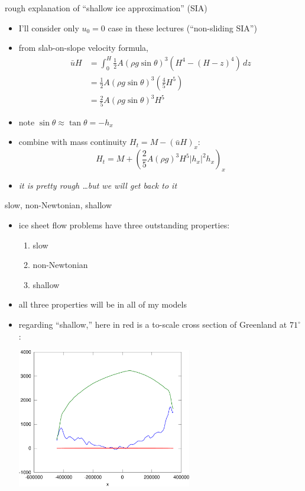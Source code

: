 \begin{frame}{rough explanation of ``shallow ice approximation'' (SIA)}

\small
\begin{itemize}
\item I'll consider only $u_0=0$ case in these lectures (``non-sliding SIA'')
\item from slab-on-slope velocity formula,
\begin{align*}
\bar u H &= \int_0^H \frac{1}{2} A (\rho g \sin\theta)^3  \left(H^4 - (H-z)^4\right)\,dz \\
	&= \frac{1}{2} A (\rho g \sin\theta)^3  \left(\frac{4}{5} H^5\right) \\
	&= \frac{2}{5} A (\rho g \sin\theta)^3 H^5
\end{align*}
\item note $\sin \theta \approx \tan\theta = - h_x$
\item combine with mass continuity $H_t = M - \left(\bar u H\right)_x$:
\begin{equation}
H_t = M + \left(\frac{2}{5} A (\rho g)^3 H^5 |h_x|^2 h_x\right)_x  \tag{0}
\end{equation}
\item \emph{it is pretty rough \dots but we will get back to it}
\end{itemize}
\end{frame}


\begin{frame}{slow, non-Newtonian, shallow}

\begin{itemize}
\item ice sheet flow problems have three outstanding properties:
  \begin{enumerate}
  \item slow
  \item non-Newtonian
  \item shallow
  \end{enumerate}
\item all three properties will be in all of my models
\item regarding ``shallow,'' here in \alert{red} is a to-scale cross section of Greenland at $71^\circ$:
\begin{center}
  \includegraphics[width=0.6\textwidth]{photos/green_transect}
\end{center}
\end{itemize}
\end{frame}


